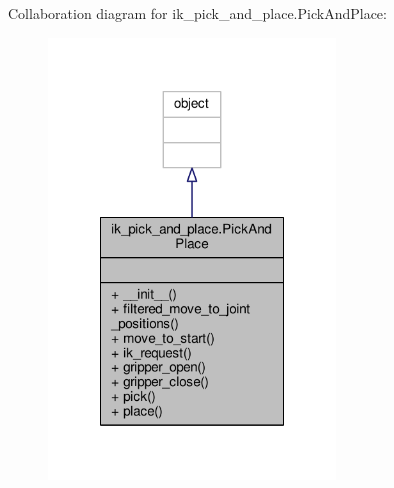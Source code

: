 Collaboration diagram for ik\-\_\-pick\-\_\-and\-\_\-place.\-Pick\-And\-Place\-:
\nopagebreak
\begin{figure}[H]
\begin{center}
\leavevmode
\includegraphics[width=216pt]{classik__pick__and__place_1_1_pick_and_place__coll__graph}
\end{center}
\end{figure}
